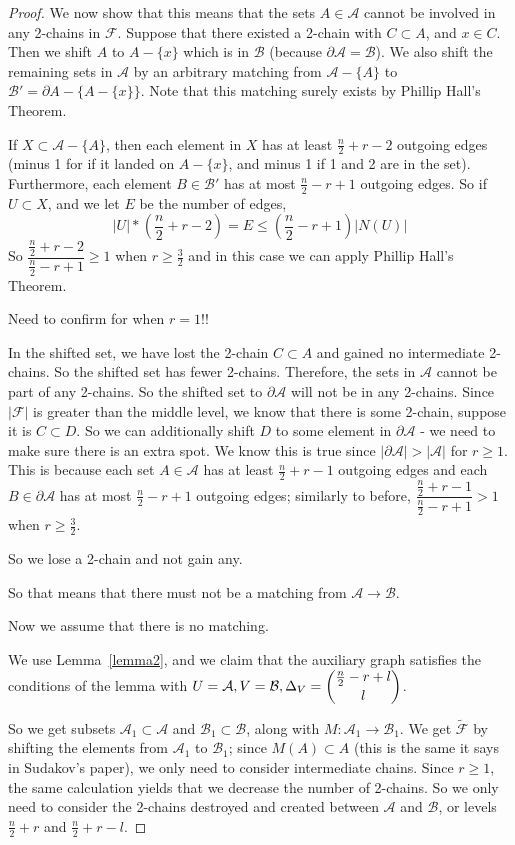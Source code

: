 \documentclass[12pt]{article}
\theoremstyle{plain}
\theoremstyle{definition}
\theoremstyle{remark}
\newcommand{\F}{\mathcal{F}}
\newcommand{\A}{\mathcal{A}}
\newcommand{\B}{\mathcal{B}}
\begin{document}
\begin{proof}
We now show that this means that the sets $A \in \A$ cannot be involved in any 2-chains in $\F$. Suppose that there existed a 2-chain with $C \subset A$, and $x \in C$. Then we shift $A$ to $A - \{ x \}$ which is in $\B$ (because $\partial \A = \B$). We also shift the remaining sets in $\A$ by an arbitrary matching from $\A - \{ A \}$ to $\B' = \partial A - \{ A - \{x\} \}$. Note that this matching surely exists by Phillip Hall's Theorem. 

If $X \subset \A - \{ A \}$, then each element in $X$ has at least $\frac{n}{2} + r - 2$ outgoing edges (minus 1 for if it landed on $A - \{x\}$, and minus 1 if 1 and 2 are in the set). Furthermore, each element $B \in \B'$ has at most $\frac{n}{2} - r + 1$ outgoing edges. So if $U \subset X$, and we let $E$ be the number of edges,
\[ |U|*(\frac{n}{2}+r-2) = E \leq (\frac{n}{2}-r+1)|N(U)| \]
So $\dfrac{\frac{n}{2}+r-2}{\frac{n}{2}-r+1} \geq 1$ when $r \geq \frac{3}{2}$ and in this case we can apply Phillip Hall's Theorem. 

Need to confirm for when $r = 1$!!

In the shifted set, we have lost the 2-chain $C \subset A$ and gained no intermediate 2-chains. So the shifted set has fewer 2-chains. Therefore, the sets in $\A$ cannot be part of any 2-chains. So the shifted set to $\partial \A$ will not be in any 2-chains. Since $|\F|$ is greater than the middle level, we know that there is some 2-chain, suppose it is $C \subset D$. So we can additionally shift $D$ to some element in $\partial \A$ - we need to make sure there is an extra spot. We know this is true since $|\partial \A| > |\A|$ for $r \geq 1$. This is because each set $A \in \A$ has at least $\frac{n}{2}+r-1$ outgoing edges and each $B \in \partial \A$ has at most $\frac{n}{2}-r+1$ outgoing edges; similarly to before, $\dfrac{\frac{n}{2}+r-1}{\frac{n}{2}-r+1} > 1$ when $r \geq \frac{3}{2}$. 

So we lose a 2-chain and not gain any. 

So that means that there must not be a matching from $\A \rightarrow \B$. 

Now we assume that there is no matching.

We use Lemma~\ref{lemma2}, and we claim that the auxiliary graph satisfies the conditions of the lemma with $U = \A, V = \B, \Delta_V = \dbinom{\frac{n}{2} - r + l}{l}$.

So we get subsets $\A_1 \subset \A$ and $\B_1 \subset \B$, along with $M:\A_1 \rightarrow \B_1$. We get $\tilde{\F}$ by shifting the elements from $\A_1$ to $\B_1$; since $M(A) \subset A$ (this is the same it says in Sudakov's paper), we only need to consider intermediate chains. Since $r \geq 1$, the same calculation yields that we decrease the number of 2-chains. So we only need to consider the 2-chains destroyed and created between $\A$ and $\B$, or levels $\frac{n}{2} + r$ and $\frac{n}{2} + r - l$.


\end{proof}
\end{document}
